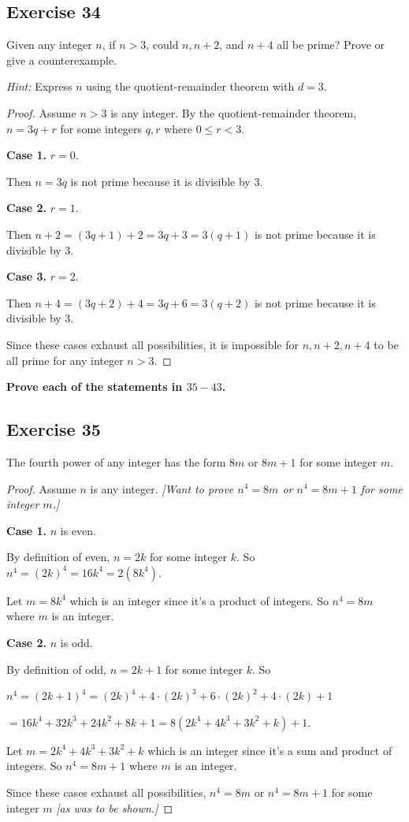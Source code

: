 \documentclass[14pt]{extarticle}
\newcommand{\cy}{\color{cyan}}
\begin{document}
\subsection{Exercise 34}
Given any integer $n$, if $n > 3$, could $n, n + 2$, and
$n + 4$ all be prime? Prove or give a counterexample.

{\it Hint:} Express $n$ using the quotient-remainder theorem with $d = 3$.

\begin{proof}
Assume $n>3$ is any integer. By the quotient-remainder theorem, $n = 3q+r$ for some integers $q,r$ where $0 \leq r < 3$.

{\bf Case 1.} $r = 0$.

Then $n = 3q$ is not prime because it is divisible by 3.

{\bf Case 2.} $r = 1$.

Then $n+2 = (3q+1)+2 = 3q+3 = 3(q+1)$ is not prime because it is divisible by 3.

{\bf Case 3.} $r = 2$.

Then $n+4 = (3q+2)+4 = 3q+6 = 3(q+2)$ is not prime because it is divisible by 3.

Since these cases exhaust all possibilities, it is impossible for $n, n+2, n+4$ to be all prime for any integer $n>3$.
\end{proof}

{\bf \cy Prove each of the statements in $35-43$.}

\subsection{Exercise 35}
The fourth power of any integer has the form $8m$ or $8m + 1$ for some integer $m$.

\begin{proof}
Assume $n$ is any integer. {\it [Want to prove $n^4 = 8m$ or $n^4 = 8m+1$ for some integer $m$.]}

{\bf Case 1.} $n$ is even.

By definition of even, $n = 2k$ for some integer $k$. So $n^4 = (2k)^4 = 16k^4 = 2(8k^4)$. 

Let $m = 8k^4$ which is an integer since it's a product of integers. So $n^4 = 8m$ where $m$ is an integer.

{\bf Case 2.} $n$ is odd.

By definition of odd, $n = 2k+1$ for some integer $k$. So 

$n^4 = (2k+1)^4 = (2k)^4 + 4 \cdot (2k)^3 + 6 \cdot (2k)^2 + 4 \cdot (2k) + 1$ 

$= 16k^4 + 32k^3 + 24k^2 + 8k + 1 = 8(2k^4 + 4k^3 + 3k^2 + k) + 1$.

Let $m = 2k^4 + 4k^3 + 3k^2 + k$ which is an integer since it's a sum and product of integers. So $n^4 = 8m + 1$ where $m$ is an integer.

Since these cases exhaust all possibilities, $n^4 = 8m$ or $n^4 = 8m+1$ for some integer $m$ {\it [as was to be shown.]}
\end{proof}
\end{document}
